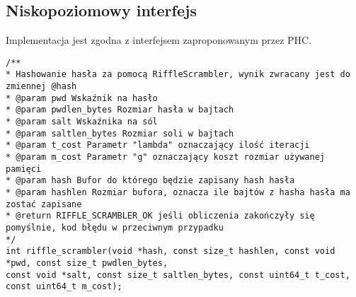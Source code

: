 \subsection{Niskopoziomowy interfejs}
Implementacja jest zgodna z interfejsem zaproponowanym przez PHC.
\begin{verbatim}
/**
* Hashowanie hasła za pomocą RiffleScrambler, wynik zwracany jest do zmiennej @hash
* @param pwd Wskaźnik na hasło
* @param pwdlen_bytes Rozmiar hasła w bajtach
* @param salt Wskaźnika na sól
* @param saltlen_bytes Rozmiar soli w bajtach
* @param t_cost Parametr "lambda" oznaczający ilość iteracji
* @param m_cost Parametr "g" oznaczający koszt rozmiar używanej pamięci
* @param hash Bufor do którego będzie zapisany hash hasła
* @param hashlen Rozmiar bufora, oznacza ile bajtów z hasha hasła ma zostać zapisane
* @return RIFFLE_SCRAMBLER_OK jeśli obliczenia zakończyły się pomyślnie, kod błędu w przeciwnym przypadku
*/
int riffle_scrambler(void *hash, const size_t hashlen, const void *pwd, const size_t pwdlen_bytes,
const void *salt, const size_t saltlen_bytes, const uint64_t t_cost, const uint64_t m_cost);
\end{verbatim}


